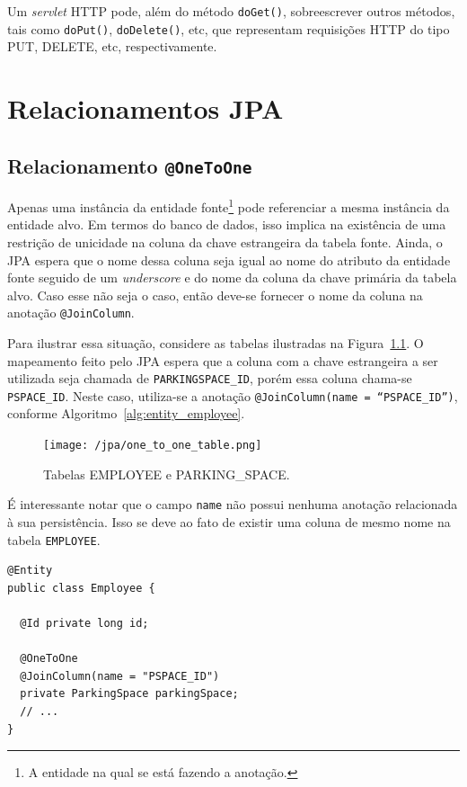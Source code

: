 \documentclass[
  10.5pt,				  %
	openright,			%
	twoside,			  %
  a5paper,
  chapter=TITLE,	%
	section=TITLE,	%
  hyphens,        %
	english,        %
	brazil          %
]{abntex2}
\begin{document}
Um \emph{servlet} HTTP pode, além do método \texttt{doGet()}, sobreescrever outros métodos, tais como \texttt{doPut()}, \texttt{doDelete()}, etc, que representam requisições HTTP do tipo PUT, DELETE, etc, respectivamente.



\chapter{Relacionamentos JPA}\label{anexo:jpa}


\section{Relacionamento \texttt{@OneToOne}}
Apenas uma instância da entidade fonte\footnote{A entidade na qual se está fazendo a anotação.} pode referenciar a mesma instância da entidade alvo. Em termos do banco de dados, isso implica na existência de uma restrição de unicidade na coluna da chave estrangeira da tabela fonte. Ainda, o JPA espera que o nome dessa coluna seja igual ao nome do atributo da entidade fonte seguido de um \emph{underscore} e do nome da coluna da chave primária da tabela alvo. Caso esse não seja o caso, então deve-se fornecer o nome da coluna na anotação \texttt{@JoinColumn}.

Para ilustrar essa situação, considere as tabelas ilustradas na Figura~\ref{fig:jpa_onetoone}. O mapeamento feito pelo JPA espera que a coluna com a chave estrangeira a ser utilizada seja chamada de \texttt{PARKINGSPACE\_ID}, porém essa coluna chama-se \texttt{PSPACE\_ID}. Neste caso, utiliza-se a anotação \texttt{@JoinColumn(name = ``PSPACE\_ID'')}, conforme Algoritmo~\ref{alg:entity_employee}.



\begin{figure}[!ht]
  \caption{\label{fig:jpa_onetoone} Tabelas EMPLOYEE e PARKING\_SPACE.}
  \begin{center}
    \texttt{[image: /jpa/one\_to\_one\_table.png]}
  \end{center}
\end{figure}

É interessante notar que o campo \texttt{name} não possui nenhuma anotação relacionada à sua persistência. Isso se deve ao fato de existir uma coluna de mesmo nome na tabela \texttt{EMPLOYEE}.

\begin{lstlisting}[caption={Classe Employee e seus relacionamentos.}, label={alg:entity_employee}]
@Entity
public class Employee {

  @Id private long id;
  
  @OneToOne
  @JoinColumn(name = "PSPACE_ID")
  private ParkingSpace parkingSpace;
  // ...
}
\end{lstlisting}
\end{document}
